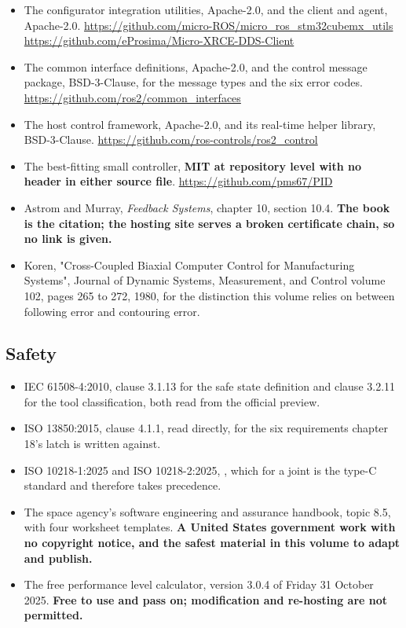 \begin{itemize}[itemsep=2pt]
\item The configurator integration utilities, Apache-2.0, and the client and
agent, Apache-2.0.\newline
\url{https://github.com/micro-ROS/micro_ros_stm32cubemx_utils}\newline
\url{https://github.com/eProsima/Micro-XRCE-DDS-Client}
\item The common interface definitions, Apache-2.0, and the control message
package, BSD-3-Clause, for the message types and the six error codes.\newline
\url{https://github.com/ros2/common_interfaces}
\item The host control framework, Apache-2.0, and its real-time helper library,
BSD-3-Clause.\newline
\url{https://github.com/ros-controls/ros2_control}
\item The best-fitting small controller, \textbf{MIT at repository level with no
header in either source file}.\newline
\url{https://github.com/pms67/PID}
\item Astrom and Murray, \textit{Feedback Systems}, chapter 10, section 10.4.
\textbf{The book is the citation; the hosting site serves a broken certificate
chain, so no link is given.}
\item Koren, "Cross-Coupled Biaxial Computer Control for Manufacturing Systems",
Journal of Dynamic Systems, Measurement, and Control volume 102, pages 265 to
272, 1980, for the distinction this volume relies on between following error and
contouring error.
\end{itemize}

\subsection*{Safety}

\begin{itemize}[itemsep=2pt]
\item IEC 61508-4:2010, clause 3.1.13 for the safe state definition and clause
3.2.11 for the tool classification, both read from the official preview.
\item ISO 13850:2015, clause 4.1.1, read directly, for the six requirements
chapter 18's latch is written against.
\item ISO 10218-1:2025 and ISO 10218-2:2025, , which for a joint is
the type-C standard and therefore takes precedence.
\item The space agency's software engineering and assurance handbook, topic 8.5,
with four worksheet templates. \textbf{A United States government work with no
copyright notice, and the safest material in this volume to adapt and publish.}
\item The free performance level calculator, version 3.0.4 of Friday 31 October
2025. \textbf{Free to use and pass on; modification and re-hosting are not
permitted.}
\end{itemize}

